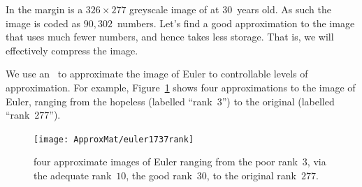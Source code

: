 \begin{example} \label{eg:euler1737}
In the margin is a \(326\times277\) greyscale image of  at 30~years old.  
As such the image is coded as \(90,302\)~numbers.
Let's find a good approximation to the image that uses much fewer numbers, and hence takes less storage.
That is, we will effectively compress the image.

\begin{solution} 
We use an \svd\ to approximate the image of Euler to controllable levels of approximation.
For example, Figure~\ref{fig:euler1737rank} shows four approximations to the image of Euler, ranging from the hopeless (labelled ``rank~3'')  to the original (labelled ``rank~277'').
\begin{figure}
\caption{four approximate images of Euler ranging from the poor rank~\(3\), via the adequate rank~\(10\), the good rank~\(30\), to the original rank~\(277\).}
\label{fig:euler1737rank}
\centering
\texttt{[image: ApproxMat/euler1737rank]}
\end{figure}


\end{solution}
\end{example}
